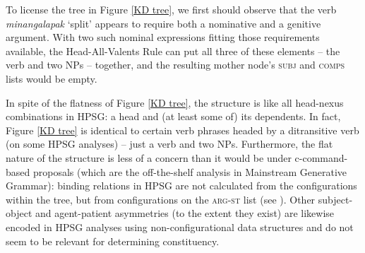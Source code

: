 \documentclass[output=paper]{langsci/langscibook}
\begin{document}
{To license the tree in Figure \ref{KD tree}, we first should observe that the verb \textit{minangalapak} `split' appears to require both a nominative and a genitive argument. With two such nominal expressions fitting those requirements available, the Head-All-Valents Rule can put all three of these elements -- the verb and two NPs -- together, and the resulting mother node's \textsc{subj} and \textsc{comps} lists would be empty.

In spite of the flatness of Figure \ref{KD tree}, the structure is like all head-nexus combinations in HPSG: a head and (at least some of) its dependents. In fact, Figure \ref{KD tree} is identical to certain verb phrases headed by a ditransitive verb (on some HPSG analyses) -- just a verb and two NPs. Furthermore, the flat nature of the structure is less of a concern than it would be under c-command-based proposals (which are the off-the-shelf analysis in Mainstream Generative Grammar): binding relations in HPSG are not calculated from the configurations within the tree, but from configurations on the \textsc{arg-st} list (see ). Other subject-object and agent-patient asymmetries (to the extent they exist) are likewise encoded in HPSG analyses using non-configurational data structures and do not seem to be relevant for determining constituency.

}
\end{document}
